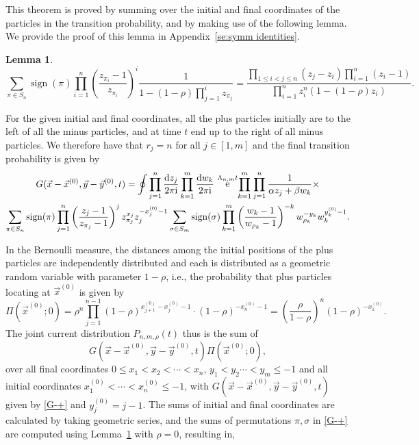 \documentclass[cmp]{svjour}
\numberwithin{theorem}{section}
\numberwithin{equation}{section}
\DeclareMathOperator{\e}{e}
\def\dd{{\rm d}}
\def\ii{{\rm i}}
\DeclareMathOperator{\sign}{sign}
\newtheorem{lemman}[theorem]{Lemma}
\begin{document}
\noindent
This theorem is proved by summing over the initial and final coordinates of the particles in the transition probability, and by making use of the following lemma. We provide the proof of this lemma in Appendix~\ref{se:symm identities}.

\medskip

\begin{lemman}
\label{lem:symm identity}
\begin{equation*}
\sum_{\pi\in S_n}\sign(\pi)\prod_{i=1}^n
\left(\frac{z_{\pi_i}-1}{z_{\pi_i}}\right)^i
\frac{1}{1-(1-\rho)\prod_{j=1}^iz_{\pi_j}}
=
\frac{\prod_{1\leq i<j \leq n}(z_j-z_i)
\prod_{i=1}^{n}(z_i-1)}
{\prod_{i=1}^{n}z_i^n(1-(1-\rho)z_i)}.
\end{equation*}
\end{lemman}


For the given initial and final coordinates, all the plus particles initially are to the left of all the minus particles, and at time $t$ end up to the right of all minus particles. We therefore have that $r_j=n$ for all $j \in [1, m]$ and the final transition probability is given by
\begin{multline}
G(\vec{x}-\vec{x}^{(0)},\vec{y}-\vec{y}^{(0)},t)
=
\oint
\prod_{j=1}^n \frac{\dd z_j }{2\pi \ii}
\prod_{k=1}^m \frac{\dd w_k }{2\pi \ii}\,
\e^{\Lambda_{n,m} t}\!
\prod_{k=1}^m \prod _{j=1}^{n} \frac{1}{\alpha z_{j} + \beta w_{k}}\times
\\
\sum_{\pi\in S_n} \sign(\pi)
\prod_{j=1}^n \left( \frac{z_j-1}{z_{\pi_j}-1}\right)^{j} z_{\pi_j}^{x_j} z_{j}^{-x^{(0)}_j-1}
\sum_{\sigma\in S_m} \sign(\sigma)
\prod_{k=1}^m  \left( \frac{w_k-1}{w_{\rho_k}-1}\right)^{-k}  w_{\rho_k}^{-y_k} w_{k}^{y^{(0)}_k-1}.
\label{G-+}
\end{multline}

In the Bernoulli measure, the distances among the initial positions of the plus particles are independently distributed and each is distributed as a geometric random variable with parameter $1-\rho$, i.e., the probability that plus particles locating at $\vec{x}^{(0)}$ is given by
\begin{equation}
\Pi(\vec{x}^{(0)};0)
=
\rho^n \prod_{j=1}^{n-1} (1-\rho)^{x_{j+1}^{(0)}-x_j^{(0)}-1} \cdot (1-\rho)^{-x_n^{(0)}-1}
=
\left(\frac{\rho}{1-\rho}\right)^n (1-\rho)^{ -x_1^{(0)}}.
\end{equation}
The joint current distribution $P_{n,m,\rho}(t)$ thus is the sum of
$$G(\vec{x}-\vec{x}^{(0)},\vec{y}-\vec{y}^{(0)},t) \Pi(\vec{x}^{(0)};0),$$ over all final coordinates $0\leq x_1<x_2<\cdots<x_n$, $y_1<y_2\cdots<y_m\leq -1$ and all initial coordinates $x_1^{(0)}<\cdots<x_n^{(0)}\leq-1$, with $G(\vec{x}-\vec{x}^{(0)},\vec{y}-\vec{y}^{(0)},t)$ given by \eqref{G-+} and $y_j^{(0)}=j-1$. The sums of initial and final coordinates are calculated by taking geometric series, and the sums of permutations $\pi,\sigma$ in \eqref{G-+} are computed using Lemma~\ref{lem:symm identity} with $\rho=0$, resulting in, 
\end{document}
